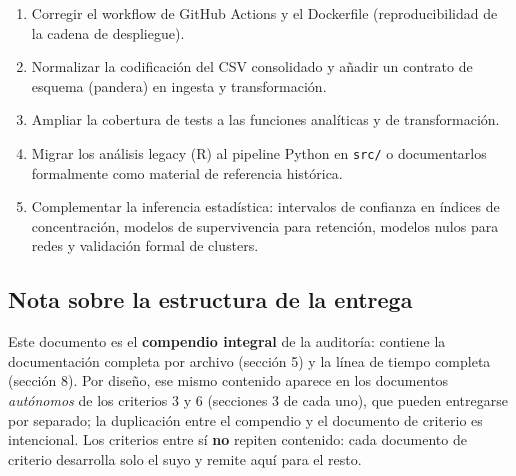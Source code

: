 \begin{enumerate}
  \item Corregir el workflow de GitHub Actions y el Dockerfile (reproducibilidad de
        la cadena de despliegue).
  \item Normalizar la codificación del CSV consolidado y añadir un contrato de
        esquema (pandera) en ingesta y transformación.
  \item Ampliar la cobertura de tests a las funciones analíticas y de transformación.
  \item Migrar los análisis legacy (R) al pipeline Python en \texttt{src/} o
        documentarlos formalmente como material de referencia histórica.
  \item Complementar la inferencia estadística: intervalos de confianza en índices
        de concentración, modelos de supervivencia para retención, modelos nulos
        para redes y validación formal de clusters.
\end{enumerate}

\subsection{Nota sobre la estructura de la entrega}

Este documento es el \textbf{compendio integral} de la auditoría: contiene la
documentación completa por archivo (sección 5) y la línea de tiempo completa
(sección 8). Por diseño, ese mismo contenido aparece en los documentos
\emph{autónomos} de los criterios 3 y 6 (secciones 3 de cada uno), que pueden
entregarse por separado; la duplicación entre el compendio y el documento de
criterio es intencional. Los criterios entre sí \textbf{no} repiten contenido:
cada documento de criterio desarrolla solo el suyo y remite aquí para el resto.
